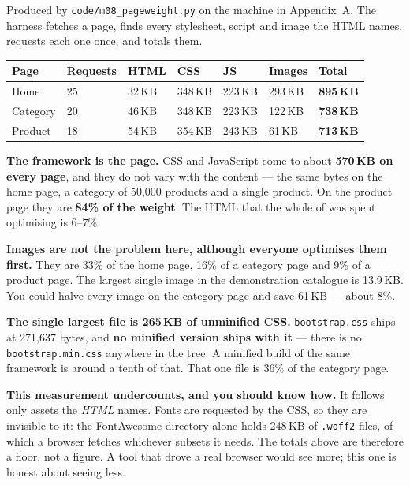 \begin{measured}
Produced by \texttt{code/m08\_pageweight.py} on the machine in Appendix~A. The
harness fetches a page, finds every stylesheet, script and image the HTML
names, requests each one once, and totals them.

\begin{longtable}{@{}L{2.0cm}L{1.9cm}L{1.6cm}L{1.6cm}L{1.6cm}L{1.6cm}L{2.0cm}@{}}
\toprule
{}
\textbf{Page} & \textbf{Requests} & \textbf{HTML} & \textbf{CSS} &
\textbf{JS} & \textbf{Images} & \textbf{Total} \\
\midrule
\endhead
Home & 25 & 32\,KB & 348\,KB & 223\,KB & 293\,KB & \textbf{895\,KB} \\
Category & 20 & 46\,KB & 348\,KB & 223\,KB & 122\,KB & \textbf{738\,KB} \\
Product & 18 & 54\,KB & 354\,KB & 243\,KB & 61\,KB & \textbf{713\,KB} \\
\bottomrule
\end{longtable}

\smallskip
\textbf{The framework is the page.} CSS and JavaScript come to about
\textbf{570\,KB on every page}, and they do not vary with the content ---
the same bytes on the home page, a category of 50{,}000 products and a single
product. On the product page they are \textbf{84\% of the weight}. The HTML
that the whole of  was spent optimising is 6--7\%.

\smallskip
\textbf{Images are not the problem here, although everyone optimises them
first.} They are 33\% of the home page, 16\% of a category page and 9\% of a
product page. The largest single image in the demonstration catalogue is
13.9\,KB. You could halve every image on the category page and save 61\,KB ---
about 8\%.

\smallskip
\textbf{The single largest file is 265\,KB of unminified CSS.}
\texttt{bootstrap.css} ships at 271{,}637 bytes, and \textbf{no minified
version ships with it} --- there is no \texttt{bootstrap.min.css} anywhere in
the tree. A minified build of the same framework is around a tenth of that.
That one file is 36\% of the category page.

\smallskip
\textbf{This measurement undercounts, and you should know how.} It follows only
assets the \emph{HTML} names. Fonts are requested by the CSS, so they are
invisible to it: the FontAwesome directory alone holds 248\,KB of
\texttt{.woff2} files, of which a browser fetches whichever subsets it needs.
The totals above are therefore a floor, not a figure. A tool that drove a real
browser would see more; this one is honest about seeing less.
\end{measured}

